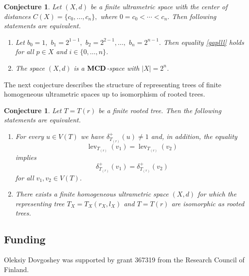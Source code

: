 \documentclass{raex}
\newtheorem{con}[thm]{Conjecture}
\theoremstyle{definition}
\theoremstyle{remark}
\numberwithin{equation}{section}
\begin{document}
\begin{con}
    \label{tcedg}
    Let $(X,d)$ be a finite ultrametric space
with the center of distances
\(
C(X)=\{c_0,\ldots,c_n\}, \) where \(0=c_0<\cdots<c_n.
\)
Then following statements are equivalent.
\begin{enumerate}
    \item  
    Let
\(
b_0=1,\) \(b_1= 2^{1-1},\) \(
b_2=2^{2-1},\ldots,\) \(b_n=2^{n-1}.
\)
Then equality \eqref{gaplll} holds 
for all $p \in X$ and $i \in \{0,\ldots,n\}$.

\item The space $(X,d)$ is a ${\bf MCD}$-space with $|X|=2^n$.
\end{enumerate}
\end{con}



The next conjecture describes the structure of representing trees of finite
homogeneous ultrametric spaces up to isomorphism of rooted trees.

\begin{con} Let $T=T(r)$ be a finite rooted tree. Then
the following statements are equivalent.
\begin{enumerate}
    \item[(i)] For every $u\in V(T)$ we have
    \(
        \delta^+_{T_{(r)}}(u)\neq 1
    \)
    and, in addition, the equality
    \[
    \operatorname{lev}_{T_{(r)}}(v_1)
        =
    \operatorname{lev}_{T_{(r)}}(v_2)
    \]
    implies
    \[
        \delta^+_{T_{(r)}}(v_1)
        =
        \delta^+_{T_{(r)}}(v_2)
    \]
    for all $v_1,v_2\in V(T)$.

    \item[(ii)] There exists a finite homogeneous ultrametric space
    $(X,d)$ for which the representing tree
    \(
        T_X=T_X(r_X,l_X)
    \)
    and $T=T(r)$ are isomorphic as rooted trees.
\end{enumerate}
\end{con}


\subsection*{Funding}
Oleksiy Dovgoshey was supported by grant 367319 from the Research Council of Finland.




\end{document}
